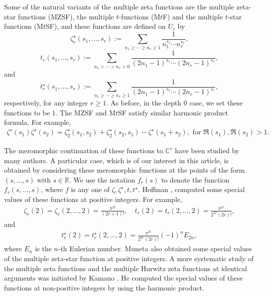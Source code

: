 \documentclass[12pt]{amsart}
\newcommand{\C}{{\mathbb C}}
\newcommand{\R}{{\mathbb R}}
\begin{document}
Some of the natural variants of the multiple zeta functions are the multiple zeta-star functions (MZSF), the multiple $t$-functions (M$t$F) and the multiple $t$-star functions (M$t$SF), and these functions are defined on $U_r$ by
$$
\zeta^{\star}_r(s_1,\ldots,s_r):=\sum_{n_1\geq\cdots\geq n_r\geq 1}\frac{1}{n_1^{s_1}\cdots n_r^{s_r}},
$$
$$
t_r(s_1,\ldots,s_r):=\sum_{n_1>\cdots> n_r>0}\frac{1}{(2n_1-1)^{s_1}\cdots (2n_r-1)^{s_r}},
$$
and 
$$
t^{\star}_r(s_1,\ldots,s_r):=\sum_{n_1\geq\cdots\geq n_r\geq 1}\frac{1}{(2n_1-1)^{s_1}\cdots (2n_r-1)^{s_r}},
$$
respectively, for any integer $r \ge 1$. As before, in the depth $0$ case, we set these functions to be $1$. The MZSF and M$t$SF satisfy similar harmonic product formula. For example, 
\begin{align}\label{eq-stuffle-star}
\zeta^{\star}(s_1)\zeta^{\star}(s_2)=\zeta^{\star}_2(s_1,s_2)+\zeta^{\star}_2(s_2,s_1)-\zeta^{\star}(s_1+s_2), \text{ for $\Re(s_1), \Re(s_2)>1$}.
\end{align}

The meromorphic continuation of these functions to $\C^r$ have been studied by many authors. A particular case, which is of our interest in this article, is obtained by considering these meromorphic functions at the points of the form $(s,\ldots,s)$ with $s\in \R$. We use the notation $f_r(s)$ to denote the function $f_r(s,\ldots,s)$, where $f$ is any one of $\zeta,\zeta^\star,t,t^\star$. Hoffman \cite{H}, \cite{H2} computed some special values of these functions at positive integers. For example,
\begin{align}\label{at-2}
\zeta_r(2)=\zeta_r(2,\ldots,2)=\frac{\pi^{2r}}{(2r+1)!}, \quad
t_r(2)=t_r(2,\ldots,2)=\frac{\pi^{2r}}{2^{2r}(2r)!}, 
\end{align}
and 
\begin{align}\label{at-22}
t^{\star}_r(2)=t^{\star}_r(2,\ldots,2)=\frac{\pi^{2r}}{2^{2r}(2r)!}(-1)^nE_{2n},
\end{align}
where $E_n$ is the $n$-th Eulerian number. Muneta \cite{M} also obtained some special values of the multiple zeta-star function at positive integers. A more systematic study of the multiple zeta functions and the multiple Hurwitz zeta functions at identical arguments was initiated by Kamano \cite{K}. He computed the special values of these functions at non-positive integers by using the harmonic product.


\end{document}
